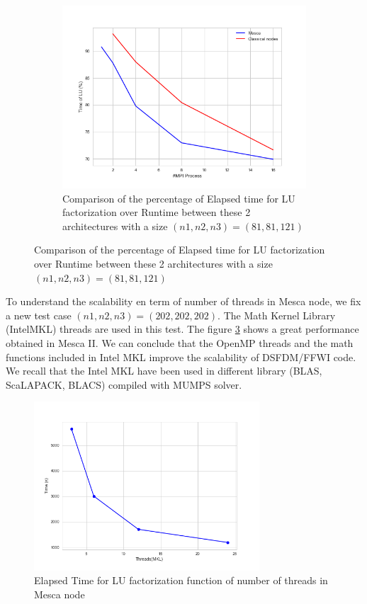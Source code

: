 \begin{figure}[!h]
  \begin{subfigure}[b]{0.7\textwidth}
    \includegraphics[width=\textwidth]{images/Comparison_Mesca_and_CN1.png}
    \caption{Comparison of the percentage of Elapsed time for LU factorization over Runtime between these 2 architectures with a size $(n1,n2,n3)=(81,81,121)$}
    \label{MemoryMPIlog}
  \end{subfigure}
\end{figure} 

To understand the scalability en term of number of threads in Mesca node, we fix a new test case $(n1,n2,n3)=( 202,202,202 )$.  The Math Kernel Library (Intel\textregistered MKL) threads are used in this test. The figure \ref{TimeThreads} shows a great performance obtained in Mesca II. We can conclude that the OpenMP threads and the math functions included in Intel MKL improve the scalability of DSFDM/FFWI code. We recall that the Intel MKL have been used in different library (BLAS, ScaLAPACK, BLACS) compiled with MUMPS solver. 

\begin{figure}[!h]
\centering 
\includegraphics[width=0.75\textwidth]{images/TimeThreads.png}
\caption{Elapsed Time for LU factorization function of number of threads in Mesca node}
\label{TimeThreads} 
\end{figure}


